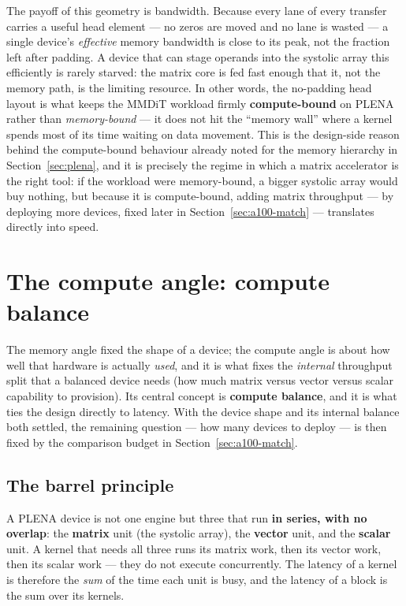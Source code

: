 \documentclass[11pt]{report}
\begin{document}
The payoff of this geometry is bandwidth. Because every lane of every
transfer carries a useful head element --- no zeros are moved and no lane
is wasted --- a single device's \emph{effective} memory bandwidth is close
to its peak, not the fraction left after padding. A device that can stage
operands into the systolic array this efficiently is rarely starved: the
matrix core is fed fast enough that it, not the memory path, is the
limiting resource. In other words, the no-padding head layout is what keeps
the MMDiT workload firmly \textbf{compute-bound} on PLENA rather than
\emph{memory-bound} --- it does not hit the ``memory wall'' where a kernel
spends most of its time waiting on data movement. This is the design-side
reason behind the compute-bound behaviour already noted for the memory
hierarchy in Section~\ref{sec:plena}, and it is precisely the regime in
which a matrix accelerator is the right tool: if the workload were
memory-bound, a bigger systolic array would buy nothing, but because it is
compute-bound, adding matrix throughput --- by deploying more devices,
fixed later in Section~\ref{sec:a100-match} --- translates directly into
speed.

\section{The compute angle: compute balance}
\label{sec:compute-angle}

The memory angle fixed the shape of a device; the compute angle is about how
well that hardware is actually \emph{used}, and it is what fixes the
\emph{internal} throughput split that a balanced device needs (how much
matrix versus vector versus scalar capability to provision). Its central
concept is \textbf{compute balance}, and it is what ties the design directly
to latency. With the device shape and its internal balance both settled, the
remaining question --- how many devices to deploy --- is then fixed by the
comparison budget in Section~\ref{sec:a100-match}.

\subsection{The barrel principle}

A PLENA device is not one engine but three that run \textbf{in series, with
no overlap}: the \textbf{matrix} unit (the systolic array), the
\textbf{vector} unit, and the \textbf{scalar} unit. A kernel that needs all
three runs its matrix work, then its vector work, then its scalar work ---
they do not execute concurrently. The latency of a kernel is therefore the
\emph{sum} of the time each unit is busy, and the latency of a block is the
sum over its kernels.
\end{document}
